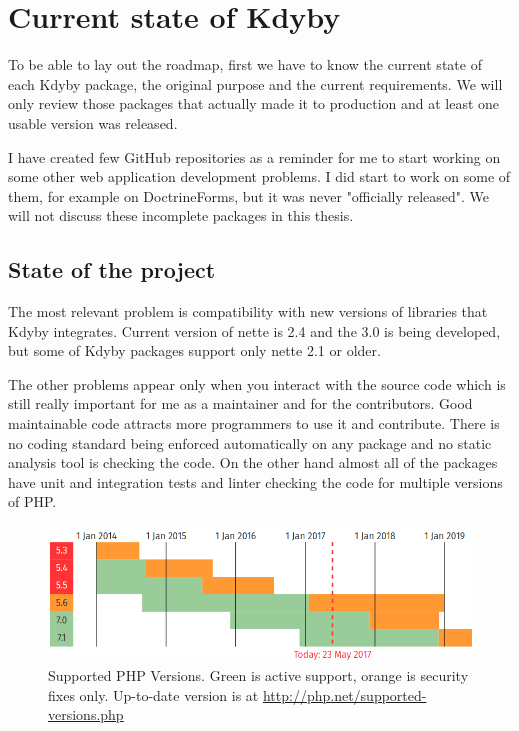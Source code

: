 \chapter{Current state of Kdyby}

To be able to lay out the roadmap, first we have to know the current state of each Kdyby package, the original purpose and the current requirements. We will only review those packages that actually made it to production and at least one usable version was released.

I have created few GitHub repositories as a reminder for me to start working on some other web application development problems. I did start to work on some of them, for example on DoctrineForms, but it was never "officially released". We will not discuss these incomplete packages in this thesis.

\section{State of the project}

The most relevant problem is compatibility with new versions of libraries that Kdyby integrates. Current version of \gls{nette} is 2.4 and the 3.0 is being developed, but some of Kdyby packages support only \gls{nette} 2.1 or older.

The other problems appear only when you interact with the source code which is still really important for me as a maintainer and for the contributors. Good maintainable code attracts more programmers to use it and contribute. There is no coding standard being enforced automatically on any package and no static analysis tool is checking the code. On the other hand almost all of the packages have unit and integration tests and linter checking the code for multiple versions of PHP.

\begin{figure} \label{fig:php:supported-versions}
  \centering
    \includegraphics[width=1\textwidth]{src/assets/php-supported-versions.png}
  \caption{Supported PHP Versions. Green is active support, orange is security fixes only. Up-to-date version is at \url{http://php.net/supported-versions.php}}
\end{figure}

